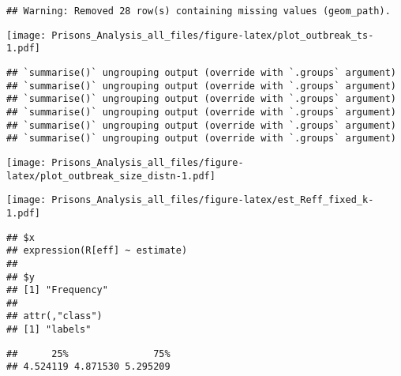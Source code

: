\documentclass[
]{article}
\begin{document}
\begin{verbatim}
## Warning: Removed 28 row(s) containing missing values (geom_path).
\end{verbatim}

\texttt{[image: Prisons\_Analysis\_all\_files/figure-latex/plot\_outbreak\_ts-1.pdf]}

\begin{verbatim}
## `summarise()` ungrouping output (override with `.groups` argument)
## `summarise()` ungrouping output (override with `.groups` argument)
## `summarise()` ungrouping output (override with `.groups` argument)
## `summarise()` ungrouping output (override with `.groups` argument)
## `summarise()` ungrouping output (override with `.groups` argument)
## `summarise()` ungrouping output (override with `.groups` argument)
\end{verbatim}

\texttt{[image: Prisons\_Analysis\_all\_files/figure-latex/plot\_outbreak\_size\_distn-1.pdf]}

\texttt{[image: Prisons\_Analysis\_all\_files/figure-latex/est\_Reff\_fixed\_k-1.pdf]}

\begin{verbatim}
## $x
## expression(R[eff] ~ estimate)
## 
## $y
## [1] "Frequency"
## 
## attr(,"class")
## [1] "labels"
\end{verbatim}

\begin{verbatim}
##      25%               75% 
## 4.524119 4.871530 5.295209
\end{verbatim}
\end{document}

